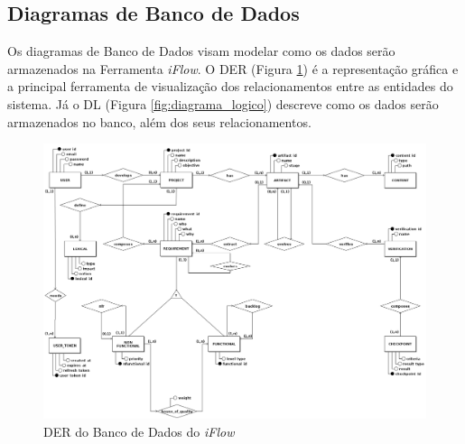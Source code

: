 \label{sec:diagramas_da_aplicacao}

\subsection{Diagramas de Banco de Dados}

Os diagramas de Banco de Dados visam modelar como os dados serão armazenados na Ferramenta \textit{iFlow}. O DER (Figura \ref{fig:diagrama_conceitual}) é a representação gráfica e a principal ferramenta de visualização dos relacionamentos entre as entidades do sistema. Já o DL (Figura \ref{fig:diagrama_logico}) descreve como os dados serão armazenados no banco, além dos seus relacionamentos.

\begin{figure}[]
    \begin{center}
        \caption{{DER do Banco de Dados do \textit{iFlow}}}
        \label{fig:diagrama_conceitual}
        \includegraphics[scale=0.30]{figuras/Proposta/Conceitual_iFlow.png}
    \end{center}
\end{figure}

